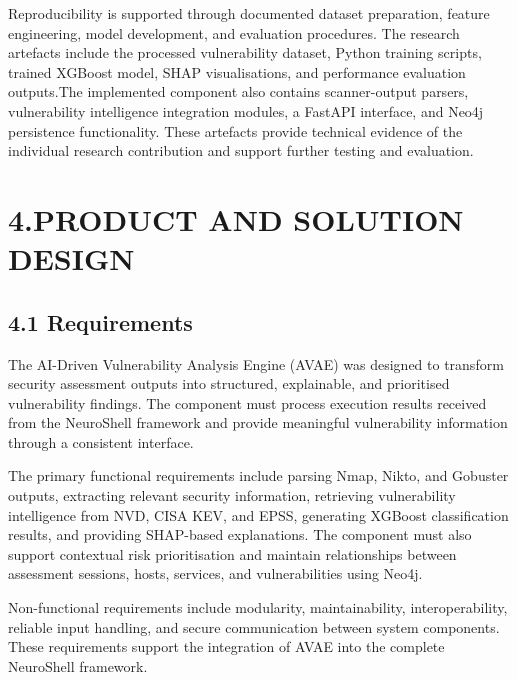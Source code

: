 \documentclass[
]{article}
\begin{document}
Reproducibility is supported through documented dataset preparation,
feature engineering, model development, and evaluation procedures. The
research artefacts include the processed vulnerability dataset, Python
training scripts, trained XGBoost model, SHAP visualisations, and
performance evaluation outputs.The implemented component also contains
scanner-output parsers, vulnerability intelligence integration modules,
a FastAPI interface, and Neo4j persistence functionality. These
artefacts provide technical evidence of the individual research
contribution and support further testing and evaluation.

\hypertarget{product-and-solution-design}{%
\section{4.PRODUCT AND SOLUTION
DESIGN}\label{product-and-solution-design}}

\hypertarget{requirements}{%
\subsection{4.1 Requirements}\label{requirements}}

The AI-Driven Vulnerability Analysis Engine (AVAE) was designed to
transform security assessment outputs into structured, explainable, and
prioritised vulnerability findings. The component must process execution
results received from the NeuroShell framework and provide meaningful
vulnerability information through a consistent interface.

The primary functional requirements include parsing Nmap, Nikto, and
Gobuster outputs, extracting relevant security information, retrieving
vulnerability intelligence from NVD, CISA KEV, and EPSS, generating
XGBoost classification results, and providing SHAP-based explanations.
The component must also support contextual risk prioritisation and
maintain relationships between assessment sessions, hosts, services, and
vulnerabilities using Neo4j.

Non-functional requirements include modularity, maintainability,
interoperability, reliable input handling, and secure communication
between system components. These requirements support the integration of
AVAE into the complete NeuroShell framework.
\end{document}
